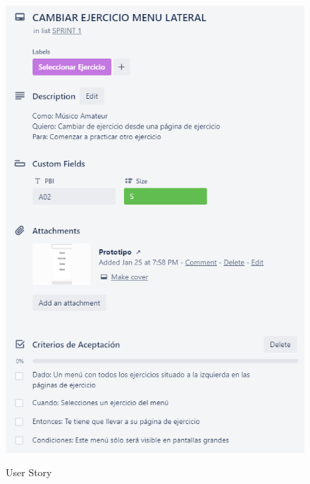 \documentclass[12pt,twoside,titlepage]{report}
\begin{document}
{\begin{figure}[H]
    \centering
    \includegraphics[scale=1.3]{Scrum/User Stories/MenuLateral}
    \label{fig:MenuLateral}
    \caption{User Story}
\end{figure}

}
\end{document}
